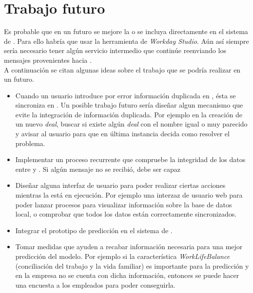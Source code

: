 \chapter{Trabajo futuro}


Es probable que en un futuro se mejore la \iface{} o se incluya directamente en el sistema de \wday{}.
Para ello habría que usar la herramienta de \textit{Workday Studio}.
Aún así siempre sería necesario tener algún servicio intermedio que continúe reenviando los mensajes provenientes \hs{} hacia \wday{}. \\

A continuación se citan algunas ideas sobre el trabajo que se podría realizar en un futuro.
\begin{itemize}
	\item Cuando un usuario introduce por error información duplicada en \hs{}, ésta se sincroniza en \wday{}. 
	Un posible trabajo futuro sería diseñar algun mecanismo que evite la integración de información duplicada. 
	Por ejemplo en la creación de un nuevo \textit{deal}, buscar si existe algún \textit{deal} con el nombre igual o muy parecido y avisar al usuario para que en última instancia decida como resolver el problema.
	
	\item Implementar un proceso recurrente que compruebe la integridad de los datos entre \hs{} y \wday{}. Si algún mensaje no se recibió, debe ser capaz 
	
	\item Diseñar alguna interfaz de usuario para poder realizar ciertas acciones mientras la \iface{} está en ejecución. Por ejemplo una interzaz de usuario web para poder lanzar procesos para visualizar información sobre la base de datos local, o comprobar que todos los datos están correctamente sincronizados.
	
	\item Integrar el prototipo de predicción en el sistema de \wday{}.
	
	\item Tomar medidas que ayuden a recabar información necesaria para una mejor predicción del modelo. 
	Por ejemplo si la característica \textit{WorkLifeBalance} (conciliación del trabajo y la vida familiar) es importante para la predicción y en la empresa no se cuenta con dicha información, entonces se puede hacer una encuesta a los empleados para poder conseguirla.

\end{itemize}



